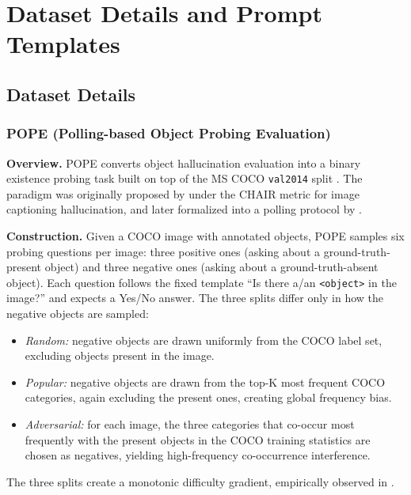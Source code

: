 \section{Dataset Details and Prompt Templates}
\label{sec:appendix}

\subsection{Dataset Details}

\subsubsection{POPE (Polling-based Object Probing Evaluation)}

\textbf{Overview.}
POPE \citep{liEvaluatingObjectHallucination2023}
converts object hallucination evaluation
into a binary existence probing task
built on top of the MS COCO \texttt{val2014} split
\citep{linMicrosoftCOCOCommon2015}.
The paradigm was originally proposed
by \citet{rohrbachObjectHallucinationImage2018}
under the CHAIR metric for image captioning hallucination,
and later formalized into a polling protocol
by \citet{liEvaluatingObjectHallucination2023}.

\textbf{Construction.}
Given a COCO image with annotated objects,
POPE samples six probing questions per image:
three positive ones (asking about a ground-truth-present object)
and three negative ones
(asking about a ground-truth-absent object).
Each question follows the fixed template
``Is there a/an \texttt{<object>} in the image?''
and expects a Yes/No answer.
The three splits differ only
in how the negative objects are sampled:
\begin{itemize}[leftmargin=*,topsep=0pt]
  \item \textit{Random:} negative objects are drawn uniformly
    from the COCO label set, excluding objects present in the image.
  \item \textit{Popular:} negative objects are drawn
    from the top-K most frequent COCO categories,
    again excluding the present ones,
    creating global frequency bias.
  \item \textit{Adversarial:} for each image,
    the three categories
    that co-occur most frequently with the present objects
    in the COCO training statistics
    are chosen as negatives,
    yielding high-frequency co-occurrence interference.
\end{itemize}
The three splits create a monotonic difficulty gradient,
empirically observed in .


